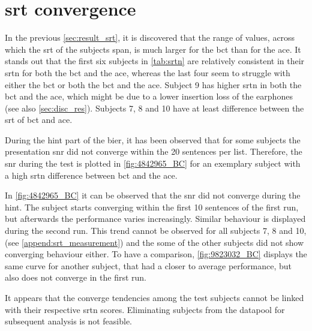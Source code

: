 \section{\gls{srt} convergence}
In the previous \autoref{sec:result_srt}, it is discovered that the range of values, across which the \gls{srt} of the subjects span, is much larger for the \gls{bct} than for the \gls{ace}. 
It stands out that the first six subjects in \autoref{tab:srtn} are relatively consistent in their \gls{srtn} for both the \gls{bct} and the \gls{ace}, whereas the last four seem to struggle with either the \gls{bct} or both the \gls{bct} and the \gls{ace}. Subject 9 has higher \gls{srtn} in both the \gls{bct} and the \gls{ace}, which might be due to a lower insertion loss of the earphones (see also \autoref{sec:disc_res}). Subjects 7, 8 and 10 have at least  difference between the \gls{srt} of \gls{bct} and \gls{ace}. 


During the \gls{hint} part of the \gls{bier}, it has been observed that for some subjects the presentation \gls{snr} did not converge within the 20 sentences per list. 
Therefore, the \gls{snr} during the test is plotted in \autoref{fig:4842965_BC} for an exemplary subject with a high \gls{srtn} difference between \gls{bct} and the \gls{ace}. 



In \autoref{fig:4842965_BC} it can be observed that the \gls{snr} did not converge during the \gls{hint}. The subject starts converging within the first 10 sentences of the first run, but afterwards the performance varies increasingly. Similar behaviour is displayed during the second run.
This trend cannot be observed for all subjects 7, 8 and 10, (see \autoref{append:srt_measurement}) and the some of the other subjects did not show converging behaviour either. 
To have a comparison, \autoref{fig:9823032_BC} displays the same curve for another subject, that had a closer to average performance, but also does not converge in the first run.

It appears that the converge tendencies among the test subjects cannot be linked with their respective \gls{srtn} scores. Eliminating subjects from the datapool for subsequent analysis is not feasible.